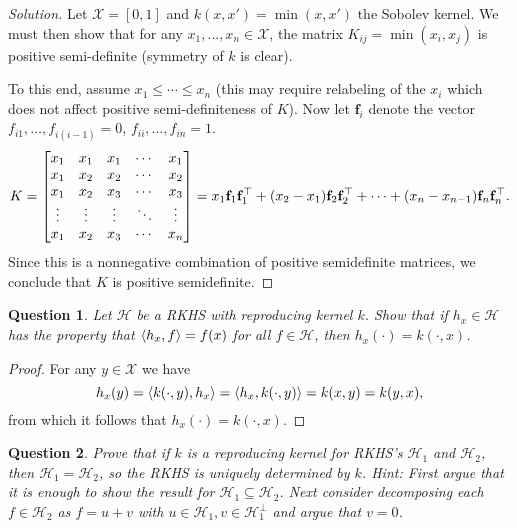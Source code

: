 \documentclass{article}
\theoremstyle{plain}
\newtheorem{question}{Question}
\theoremstyle{remark}
\newenvironment{solution}{\begin{proof}[Solution]\renewcommand\qedsymbol{}}{\end{proof}}
\renewcommand{\vec}{\mathbf}
\newcommand{\Cal}{\mathcal}
\newcommand\XX{\Cal X}
\newcommand\HH{\Cal H}
\DeclarePairedDelimiter{\ang}{\langle}{\rangle}
\newcommand{\T}{^\top} %
\renewcommand\P{^\perp}
\begin{document}
\begin{solution}
	Let $\XX = [0, 1]$ and $k(x, x') = \min(x, x')$ the Sobolev kernel. We must then show that for any $x_1, \dotsc, x_n \in \XX$, the matrix $K_{ij} = \min(x_i, x_j)$ is positive semi-definite (symmetry of $k$ is clear). 
	
	To this end, assume $x_1 \leq \dotsb \leq x_n$ (this may require relabeling of the $x_i$ which does not affect positive semi-definiteness of $K$). Now let $\vec f_i$ denote the vector $f_{i1}, \dotsc, f_{i(i-1)} = 0$, $f_{ii}, \dotsc, f_{in} = 1$. 
	\[
	K = \mqty[ x_1 & x_1 & x_1 & \cdots & x_1 \\
	x_1 & x_2 & x_2 & \dotsb & x_2 \\
	x_1 & x_2 & x_3 & \dotsb & x_3 \\
	\vdots & \vdots & \vdots & \ddots & \vdots \\
	x_1 & x_2 & x_3 & \cdots & x_n] = x_1 \vec f_1 \vec f_1\T + (x_2 - x_1) \vec f_2 \vec f_2\T + \dotsb + (x_n - x_{n-1}) \vec f_n \vec f_n\T. 
	\]
	Since this is a nonnegative combination of positive semidefinite matrices, we conclude that $K$ is positive semidefinite. 
\end{solution}

\begin{question}
	Let $\HH$ be a RKHS with reproducing kernel $k$. Show that if $h_x \in \HH$ has the property that $\ang{h_x, f} = f(x)$ for all $f \in \HH$, then $h_x(\cdot) = k(\cdot, x)$. 
\end{question}

\begin{proof}
	For any $y \in \XX$ we have
	\[
	h_x(y) = \ang{k(\cdot, y), h_x} = \ang{h_x, k(\cdot, y)} = k(x, y) = k(y, x),
	\]
	from which it follows that $h_x(\cdot) = k(\cdot, x)$. 
\end{proof}

\begin{question}
	Prove that if $k$ is a reproducing kernel for RKHS's $\HH_1$ and $\HH_2$, then $\HH_1 = \HH_2$, so the RKHS is uniquely determined by $k$. \emph{Hint: First argue that it is enough to show the result for $\HH_1 \subseteq \HH_2$. Next consider decomposing each $f \in \HH_2$ as $f = u+ v$ with $u \in \HH_1, v \in \HH_1\P$ and argue that $v = 0$. }
\end{question}
\end{document}
